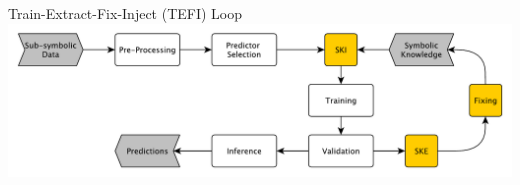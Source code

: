 \documentclass[presentation]{beamer}\mode<presentation>{\usetheme{AMSBolognaFC}}
\begin{document}
\begin{frame}{Train-Extract-Fix-Inject (TEFI) Loop}
    \includegraphics[width=\linewidth]{figures/train-extract-fix-inject.pdf}
\end{frame}

\section*{}

\frame{\titlepage}

\section*{\refname}

\begin{frame}{\refname}
    \scriptsize
    
    
\end{frame}

\end{document}
